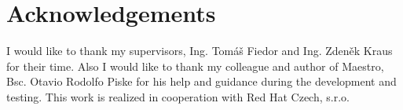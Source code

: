 \documentclass{ExcelAtFIT}
\begin{document}
\section*{Acknowledgements}
I would like to thank my supervisors, Ing. Tomáš Fiedor and Ing. Zdeněk Kraus for their time. Also I would like to thank my colleague and author of Maestro, Bsc. Otavio Rodolfo Piske for his help and guidance during the development and testing. This work is realized in cooperation with Red Hat Czech, s.r.o.




\end{document}
